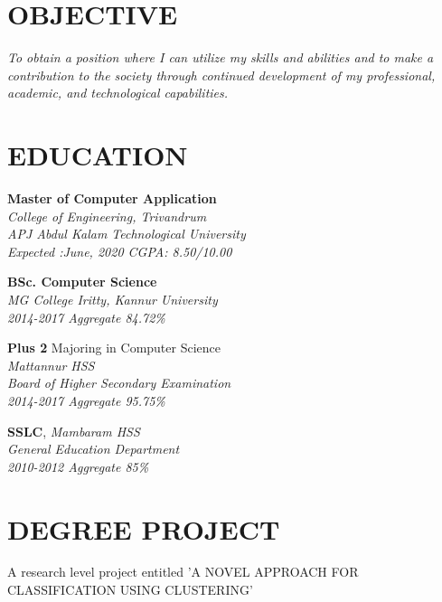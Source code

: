 \documentclass[margin]{res}
\begin{document}
\address{\\LinkedIn : https://www.linkedin.com/in/vyshak-puthusseri-5b66a7112
\\Github   : https://github.com/puthusseri}
\address{vyshakputhusseri@gmail.com \\(+91) 7560817388\\Vykundam\\PO Uruvachal \\Mattannur\\Kannur\\670702\\}

\begin{resume}

\section{OBJECTIVE}
    \sl \normalfont To obtain a position where I can utilize my skills and abilities and to make a contribution to the society through continued development of my professional, academic, and technological capabilities.

\section{EDUCATION}
    \textbf{Master of Computer Application}
    \sl \\ \normalfont College of Engineering, Trivandrum\\
    APJ Abdul Kalam Technological University\\
    Expected :June, 2020
    \hfill CGPA: 8.50/10.00
    
    \textbf{BSc. Computer Science} 
    \sl \\ \normalfont MG College Iritty, Kannur University\\ 2014-2017
    \hfill Aggregate 84.72\%
    
    \textbf{Plus 2} Majoring in Computer Science \\
    \sl \normalfont Mattannur HSS\\
    Board of Higher
    Secondary Examination\\
    2014-2017
    \hfill Aggregate 95.75\%
    
    \textbf{SSLC}, \sl \normalfont Mambaram HSS \\
    General Education Department\\
    2010-2012
    \hfill Aggregate 85\%

\section{DEGREE PROJECT} 
A research level project entitled 'A NOVEL APPROACH FOR CLASSIFICATION USING CLUSTERING'

\end{resume}
\end{document}
